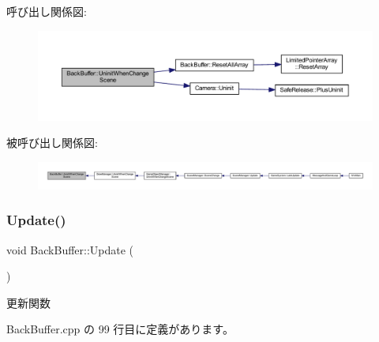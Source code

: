 呼び出し関係図\+:
\nopagebreak
\begin{figure}[H]
\begin{center}
\leavevmode
\includegraphics[width=350pt]{class_back_buffer_a989c5474cabde7f88c197a2a235e8424_cgraph}
\end{center}
\end{figure}
被呼び出し関係図\+:
\nopagebreak
\begin{figure}[H]
\begin{center}
\leavevmode
\includegraphics[width=350pt]{class_back_buffer_a989c5474cabde7f88c197a2a235e8424_icgraph}
\end{center}
\end{figure}
\mbox{\label{class_back_buffer_a11c7fa5da3d892c72bf6d44e7b269c62}} 
\subsubsection{\texorpdfstring{Update()}{Update()}}
{\footnotesize\ttfamily void Back\+Buffer\+::\+Update (\begin{DoxyParamCaption}{ }\end{DoxyParamCaption})}



更新関数 



 Back\+Buffer.\+cpp の 99 行目に定義があります。

